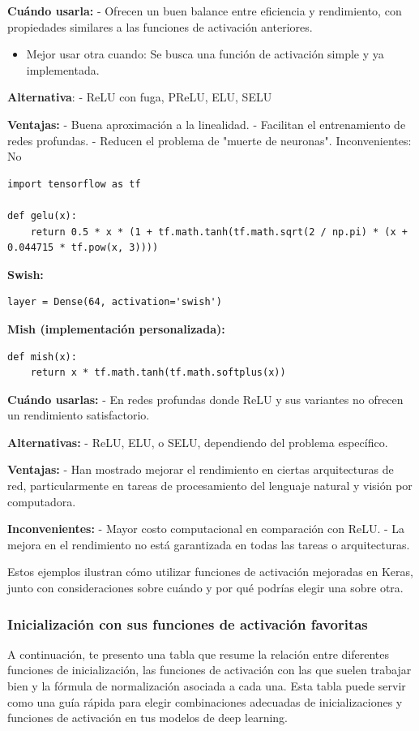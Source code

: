 \documentclass[11pt]{article}
\begin{document}
\textbf{Cuándo usarla:} - Ofrecen un buen balance entre eficiencia y
rendimiento, con propiedades similares a las funciones de activación
anteriores.

\begin{itemize}
\item Mejor usar otra cuando: Se busca una función de activación simple y ya
implementada.
\end{itemize}

\textbf{Alternativa}: - ReLU con fuga, PReLU, ELU, SELU

\textbf{Ventajas:} - Buena aproximación a la linealidad. - Facilitan el
entrenamiento de redes profundas. - Reducen el problema de "muerte de
neuronas". Inconvenientes: No

\begin{verbatim}
import tensorflow as tf

def gelu(x):
    return 0.5 * x * (1 + tf.math.tanh(tf.math.sqrt(2 / np.pi) * (x + 0.044715 * tf.pow(x, 3))))
\end{verbatim}

\textbf{Swish:}

\begin{verbatim}
layer = Dense(64, activation='swish')
\end{verbatim}

\textbf{Mish (implementación personalizada):}

\begin{verbatim}
def mish(x):
    return x * tf.math.tanh(tf.math.softplus(x))
\end{verbatim}

\textbf{Cuándo usarlas:} - En redes profundas donde ReLU y sus variantes no
ofrecen un rendimiento satisfactorio.

\textbf{Alternativas:} - ReLU, ELU, o SELU, dependiendo del problema
específico.

\textbf{Ventajas:} - Han mostrado mejorar el rendimiento en ciertas
arquitecturas de red, particularmente en tareas de procesamiento del
lenguaje natural y visión por computadora.

\textbf{Inconvenientes:} - Mayor costo computacional en comparación con ReLU. -
La mejora en el rendimiento no está garantizada en todas las tareas o
arquitecturas.

Estos ejemplos ilustran cómo utilizar funciones de activación mejoradas
en Keras, junto con consideraciones sobre cuándo y por qué podrías
elegir una sobre otra.

\subsubsection{Inicialización con sus funciones de activación favoritas}
\label{sec:org5ee17f6}
A continuación, te presento una tabla que resume la relación entre
diferentes funciones de inicialización, las funciones de activación con
las que suelen trabajar bien y la fórmula de normalización asociada a
cada una. Esta tabla puede servir como una guía rápida para elegir
combinaciones adecuadas de inicializaciones y funciones de activación en
tus modelos de deep learning.
\end{document}

